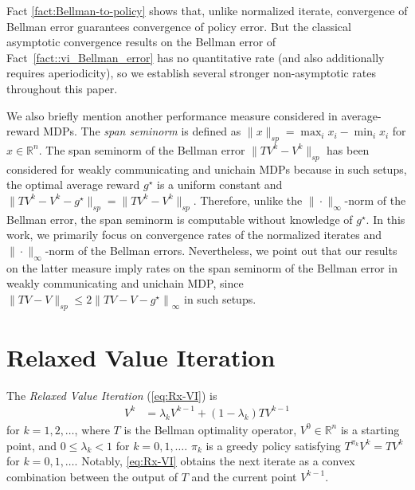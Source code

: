 \documentclass{article} %
\newcommand{\reals}{\mathbb{R}}
\newcommand*{\infn}[1]{\left\|{#1}\right\|_{\infty}}
\begin{document}
Fact \ref{fact:Bellman-to-policy} shows that, unlike normalized iterate, convergence of Bellman error guarantees convergence of policy error. But the classical asymptotic convergence results on the Bellman error of Fact~\ref{fact::vi_Bellman_error} has no quantitative rate (and also additionally requires aperiodicity), so we establish several stronger non-asymptotic rates throughout this paper. 

We also briefly mention another performance measure considered in average-reward MDPs. The \emph{span seminorm} is defined as $\|x\|_{sp} = \max_{i} x_i - \min_{i} x_i$ for $x \in \reals^n$. The span seminorm of the Bellman error $\|TV^k-V^k\|_{sp}$ has been considered for weakly communicating and unichain MDPs because in such setups, the optimal average reward $g^{\star}$ is a uniform constant and $\|TV^k-V^k-g^{\star}\|_{sp} = \|TV^k-V^k\|_{sp}$. Therefore, unlike the $\|\cdot\|_\infty$-norm of the Bellman error, the span seminorm is computable without knowledge of $g^{\star}$. In this work, we primarily focus on convergence rates of the normalized iterates and $\|\cdot\|_\infty$-norm of the Bellman errors. Nevertheless, we point out that our results on the latter measure imply rates on the span seminorm of the Bellman error in weakly communicating and unichain MDP, since $\|TV-V\|_{sp} \le 2\infn{TV-V-g^{\star}}$  \cite[Section 6.6.1]{10.5555/528623} in such setups. 

\section{Relaxed Value Iteration}\label{sec::KM-VI}
The \emph{Relaxed Value Iteration} (\ref{eq:Rx-VI}) is
\begin{align}
    V^{k} &=\lambda_{k}V^{k-1}+(1-\lambda_{k}) TV^{k-1} \tag{Rx-VI}
    \label{eq:Rx-VI}
\end{align}
for $k=1,2,\dots$, where $T$ is the Bellman optimality operator, $V^0\in \mathbb{R}^n$ is a starting point, and $0 \le \lambda_{k}<1$ for $k=0,1,\dots$. $\pi_k$ is a greedy policy satisfying $T^{\pi_k}V^k= TV^k$ for $k=0,1,\dots$. Notably, \ref{eq:Rx-VI} obtains the next iterate as a convex combination between the output of $T$ and the current point $V^{k-1}$. 
\end{document}
